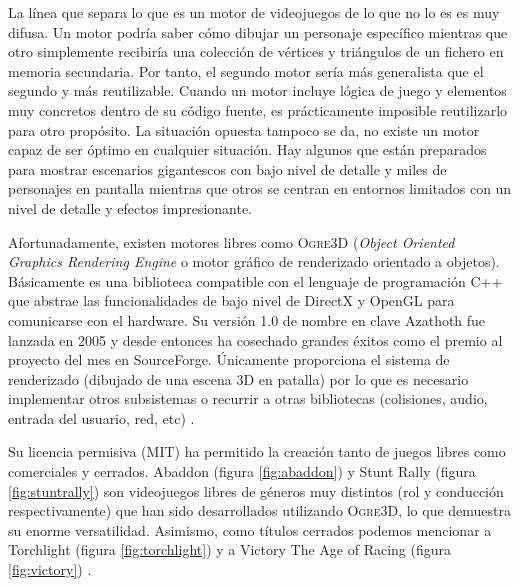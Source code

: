 La línea que separa lo que es un motor de videojuegos de lo que no lo es
es muy difusa. Un motor podría saber cómo dibujar un personaje específico
mientras que otro simplemente recibiría una colección de vértices y triángulos
de un fichero en memoria secundaria. Por tanto, el segundo motor sería
más generalista que el segundo y más reutilizable. Cuando un motor incluye
lógica de juego y elementos muy concretos dentro de su código fuente, es 
prácticamente imposible reutilizarlo para otro propósito. La situación opuesta
tampoco se da, no existe un motor capaz de ser óptimo en cualquier situación.
Hay algunos que están preparados para mostrar escenarios gigantescos con bajo
nivel de detalle y miles de personajes en pantalla mientras que otros
se centran en entornos limitados con un nivel de detalle y efectos impresionante.\\


Afortunadamente, existen motores libres como \textsc{Ogre3D} (\textit{Object
Oriented Graphics Rendering Engine} o motor gráfico de renderizado orientado
a objetos). Básicamente es una biblioteca compatible con el lenguaje de
programación C++ que abstrae las funcionalidades de bajo nivel de DirectX \cite{website:directx}
y OpenGL \cite{website:opengl} para comunicarse con el hardware. Su versión
1.0 de nombre en clave Azathoth fue lanzada en 2005 y desde entonces ha cosechado
grandes éxitos como el premio al proyecto del mes en SourceForge. Únicamente
proporciona el sistema de renderizado (dibujado de una escena 3D en patalla)
por lo que es necesario implementar otros subsistemas o recurrir a otras bibliotecas
(colisiones, audio, entrada del usuario, red, etc) \cite{junk06}.\\


Su licencia permisiva (MIT) ha permitido la creación tanto de juegos libres
como comerciales y cerrados. Abaddon (figura \ref{fig:abaddon}) y Stunt Rally (figura
\ref{fig:stuntrally}) son videojuegos libres de géneros muy distintos (rol y conducción
respectivamente) que han sido desarrollados utilizando \textsc{Ogre3D}, lo que
demuestra su enorme versatilidad. Asimismo, como títulos cerrados
podemos mencionar a Torchlight (figura \ref{fig:torchlight}) y a Victory The Age of Racing
(figura \ref{fig:victory}) \cite{junk06}. \\


